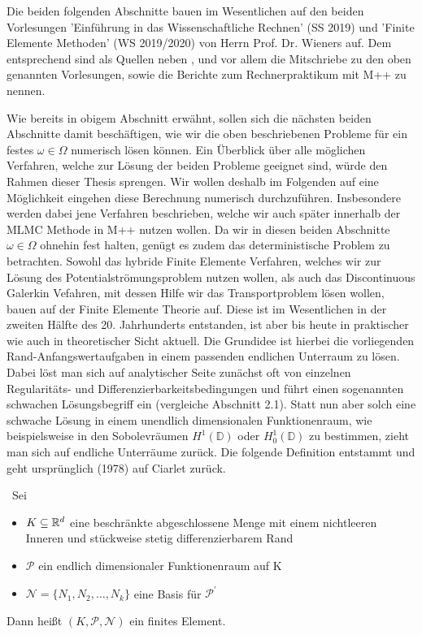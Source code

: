 \label{num_pot}
\begin{Bemerkung}
	Die beiden folgenden Abschnitte bauen im Wesentlichen auf den beiden Vorlesungen 'Einführung in das Wissenschaftliche Rechnen' (SS 2019) und 'Finite Elemente Methoden' (WS 2019/2020) von Herrn Prof. Dr. Wieners auf. Dem entsprechend sind als Quellen neben \cite{brenner2007mathematical},
	\cite{braess2013finite} und \cite{hanke2002grundlagen} vor allem die Mitschriebe zu den oben genannten Vorlesungen, sowie die Berichte zum Rechnerpraktikum mit M++ \cite{siteM++} zu nennen.
\end{Bemerkung}
Wie bereits in obigem Abschnitt erwähnt, sollen sich die nächsten beiden Abschnitte damit beschäftigen, wie wir die oben beschriebenen Probleme für ein festes $\omega \in \Omega$ numerisch lösen können. 
Ein Überblick über alle möglichen Verfahren, welche zur Lösung der beiden Probleme geeignet sind, würde den Rahmen dieser Thesis sprengen. Wir wollen deshalb im Folgenden auf eine Möglichkeit eingehen diese Berechnung numerisch durchzuführen. Insbesondere werden dabei jene Verfahren beschrieben, welche wir auch später innerhalb der MLMC Methode in M++ nutzen wollen.
Da wir in diesen beiden Abschnitte $\omega \in \Omega$ ohnehin fest halten, genügt es zudem das deterministische Problem zu betrachten. \newline
Sowohl das hybride Finite Elemente Verfahren, welches wir zur Lösung des Potentialströmungsproblem nutzen wollen, als auch das Discontinuous Galerkin Vefahren, mit dessen Hilfe wir das Transportproblem lösen wollen, bauen auf der Finite Elemente Theorie auf. 
Diese ist im Wesentlichen in der zweiten Hälfte des 20. Jahrhunderts entstanden, ist aber bis heute in praktischer wie auch in theoretischer Sicht aktuell.
Die Grundidee ist hierbei die vorliegenden Rand-Anfangswertaufgaben in einem passenden endlichen Unterraum zu lösen. Dabei löst man sich auf analytischer Seite zunächst oft von einzelnen Regularitäts- und Differenzierbarkeitsbedingungen und führt einen sogenannten schwachen Lösungsbegriff ein (vergleiche Abschnitt 2.1). Statt nun aber solch eine schwache Lösung in einem unendlich dimensionalen Funktionenraum, wie beispielsweise in den Sobolevräumen $H^1(\mathbb{D})$ oder $H_0^1(\mathbb{D})$ zu bestimmen, zieht man sich auf endliche Unterräume zurück. \newline
Die folgende Definition entstammt \cite{brenner2007mathematical} und geht ursprünglich (1978) auf Ciarlet zurück.
\begin{Definition}\
	Sei
	\begin{itemize}
		\item $K \subseteq \mathbb{R}^d$ eine beschränkte abgeschlossene Menge mit einem nichtleeren Inneren und stückweise stetig differenzierbarem Rand 
		\item $\mathcal{P}$ ein endlich dimensionaler Funktionenraum auf K
		\item $\mathcal{N} = \{N_1,N_2,\dots,N_k \}$ eine Basis für $\mathcal{P}^{'}$
	\end{itemize}
	Dann heißt $(K,\mathcal{P},\mathcal{N})$ ein finites Element.
\end{Definition}

